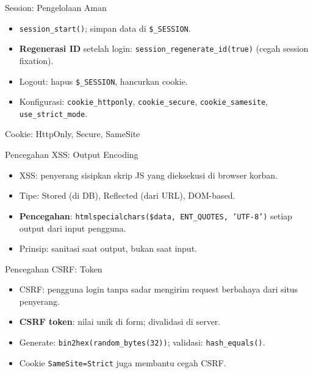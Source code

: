 \documentclass[handout]{beamer}
\begin{document}
\begin{frame}{Session: Pengelolaan Aman}
	\begin{itemize}
		\item \texttt{session\_start()}; simpan data di \texttt{\$\_SESSION}.
		\item \textbf{Regenerasi ID} setelah login: \texttt{session\_regenerate\_id(true)} (cegah session fixation).
		\item Logout: hapus \texttt{\$\_SESSION}, hancurkan cookie.
		\item Konfigurasi: \texttt{cookie\_httponly}, \texttt{cookie\_secure}, \texttt{cookie\_samesite}, \texttt{use\_strict\_mode}.
	\end{itemize}
\end{frame}

\begin{frame}{Cookie: HttpOnly, Secure, SameSite}
\end{frame}

\begin{frame}{Pencegahan XSS: Output Encoding}
	\begin{itemize}
		\item XSS: penyerang sisipkan skrip JS yang dieksekusi di browser korban.
		\item Tipe: Stored (di DB), Reflected (dari URL), DOM-based.
		\item \textbf{Pencegahan}: \texttt{htmlspecialchars(\$data, ENT\_QUOTES, 'UTF-8')} setiap output dari input pengguna.
		\item Prinsip: sanitasi saat output, bukan saat input.
	\end{itemize}
\end{frame}

\begin{frame}{Pencegahan CSRF: Token}
	\begin{itemize}
		\item CSRF: pengguna login tanpa sadar mengirim request berbahaya dari situs penyerang.
		\item \textbf{CSRF token}: nilai unik di form; divalidasi di server.
		\item Generate: \texttt{bin2hex(random\_bytes(32))}; validasi: \texttt{hash\_equals()}.
		\item Cookie \texttt{SameSite=Strict} juga membantu cegah CSRF.
	\end{itemize}
\end{frame}
\end{document}
